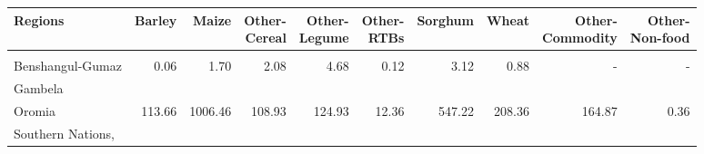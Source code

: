 \begin{table}[!h]
\centering\begingroup\fontsize{7}{9}\selectfont

\begin{tabular}{>{\raggedright\arraybackslash}p{1.8cm}rrrrrrrrr}
\toprule
Regions & Barley & Maize & \makecell{Other-\\Cereal} & \makecell{Other-\\Legume} & \makecell{Other-\\RTBs} & Sorghum & Wheat & \makecell{Other-\\Commodity} & \makecell{Other-\\Non-food}\\
\midrule
\cellcolor{gray!10}{Amhara} & \cellcolor{gray!10}{2.79} & \cellcolor{gray!10}{11.61} & \cellcolor{gray!10}{3.71} & \cellcolor{gray!10}{4.42} & \cellcolor{gray!10}{0.88} & \cellcolor{gray!10}{3.93} & \cellcolor{gray!10}{4.39} & \cellcolor{gray!10}{-} & \cellcolor{gray!10}{-}\\
Benshangul-Gumaz & 0.06 & 1.70 & 2.08 & 4.68 & 0.12 & 3.12 & 0.88 & - & -\\
Gambela
\cellcolor{gray!10}{Peoples} & \cellcolor{gray!10}{-} & \cellcolor{gray!10}{-} & \cellcolor{gray!10}{-} & \cellcolor{gray!10}{0.06} & \cellcolor{gray!10}{-} & \cellcolor{gray!10}{-} & \cellcolor{gray!10}{-} & \cellcolor{gray!10}{-} & \cellcolor{gray!10}{-}\\
Oromia & 113.66 & 1006.46 & 108.93 & 124.93 & 12.36 & 547.22 & 208.36 & 164.87 & 0.36\\
Southern
Nations,
\cellcolor{gray!10}{Nationalities} & \cellcolor{gray!10}{9.85} & \cellcolor{gray!10}{19.33} & \cellcolor{gray!10}{0.35} & \cellcolor{gray!10}{59.69} & \cellcolor{gray!10}{1.39} & \cellcolor{gray!10}{25.49} & \cellcolor{gray!10}{10.73} & \cellcolor{gray!10}{-} & \cellcolor{gray!10}{-}\\
\bottomrule
\end{tabular}
\endgroup{}
\end{table}
